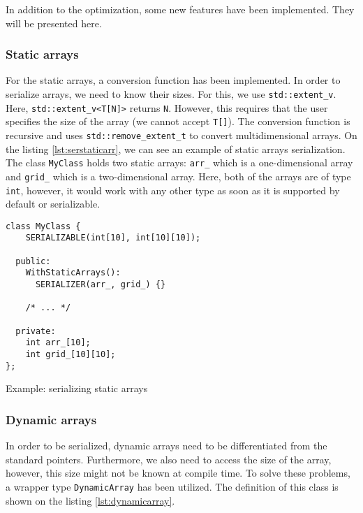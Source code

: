In addition to the optimization, some new features have been implemented. They
will be presented here.

\subsubsection{Static arrays}

For the static arrays, a conversion function has been implemented. In order to
serialize arrays, we need to know their sizes. For this, we use
\texttt{std::extent\_v}. Here, \texttt{std::extent\_v<T[N]>} returns \texttt{N}.
However, this requires that the user specifies the size of the array (we cannot
accept \texttt{T[]}). The conversion function is recursive and uses
\texttt{std::remove\_extent\_t} to convert multidimensional arrays. On the
listing \ref{lst:serstaticarr}, we can see an example of static arrays
serialization. The class \texttt{MyClass} holds two static arrays:
\texttt{arr\_} which is a one-dimensional array and \texttt{grid\_} which is a
two-dimensional array. Here, both of the arrays are of type \texttt{int},
however, it would work with any other type as soon as it is supported by default
or serializable.

\begin{listing}[ht!]
\begin{verbatim}
class MyClass {
    SERIALIZABLE(int[10], int[10][10]);

  public:
    WithStaticArrays():
      SERIALIZER(arr_, grid_) {}

    /* ... */

  private:
    int arr_[10];
    int grid_[10][10];
};
\end{verbatim}
\caption{Example: serializing static arrays}
\label{lst:serstaticarr}
\end{listing}

\subsubsection{Dynamic arrays}

In order to be serialized, dynamic arrays need to be differentiated from the
standard pointers. Furthermore, we also need to access the size of the array,
however, this size might not be known at compile time. To solve these problems,
a wrapper type \texttt{DynamicArray} has been utilized. The definition of this
class is shown on the listing \ref{lst:dynamicarray}.

